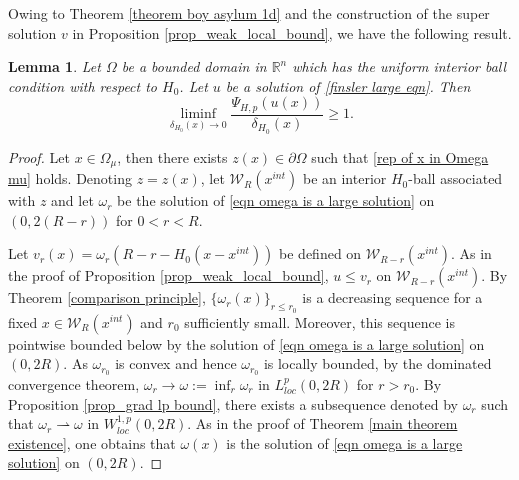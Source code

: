 \documentclass[11pt]{amsart}
\newtheorem{lemma}[theorem]{Lemma}
\newcommand{\rn}{\mathbb{R}^{n}}
\numberwithin{equation}{section}
\begin{document}
Owing to Theorem \ref{theorem boy asylum 1d} and the construction of the super solution $v$ in Proposition \ref{prop_weak_local_bound}, we have the following result.
   \begin{lemma}\label{lemma asym 1}
       Let $\Omega$ be a bounded domain in $\rn$ which has the uniform interior ball condition with respect to $H_{0}$. Let $u$ be a solution of \eqref{finsler large eqn}.  Then 
       \begin{equation*}
           \liminf_{\delta_{H_{0}}(x)\to 0}\frac{\Psi_{H,p}\left(u(x)\right)}{\delta_{H_{0}}(x)}\geq 1.
       \end{equation*}
   \end{lemma}
   \begin{proof}
   Let $x\in \Omega_{\mu}$, then there exists $z(x)\in \partial\Omega$ such that \eqref{rep of x in Omega mu} holds. Denoting $z=z(x)$, let $\mathcal{W}_{R}(x^{int})$ be an interior $H_{0}$-ball associated with $z$ and let $\omega_{r}$ be the solution of \eqref{eqn omega is a large solution} on $(0,2(R-r))$ for $0<r<R$.
   
   Let $v_{r}(x)=\omega_{r}\left(R-r-H_{0}(x-x^{int})\right)$ be defined on $\mathcal{W}_{R-r}(x^{int})$. As in the proof of Proposition \ref{prop_weak_local_bound}, $u\leq v_{r}$ on $\mathcal{W}_{R-r}(x^{int})$. By Theorem \ref{comparison principle}, $\{\omega_{r}(x)\}_{r\leq r_{0}}$ is a decreasing sequence for a fixed $x\in \mathcal{W}_{R}(x^{int})$ and $r_{0}$ sufficiently small. Moreover, this sequence is pointwise bounded below by the solution of \eqref{eqn omega is a large solution} on $(0,2R)$. As $\omega_{r_{0}}$ is convex and hence $\omega_{r_{0}}$ is locally bounded, by the dominated convergence theorem, $\omega_{r}\to \omega:=\inf_{r}\omega_{r}$ in $L^{p}_{loc}(0,2R)$ for $r>r_{0}$. By Proposition \ref{prop_grad lp bound}, there exists a subsequence denoted by $\omega_{r}$ such that $\omega_{r}\rightharpoonup \omega$ in $W^{1,p}_{loc}(0,2R)$. As in the proof of Theorem \ref{main theorem existence}, one obtains that $\omega(x)$ is the solution of \eqref{eqn omega is a large solution} on $(0,2R)$.  
    

\end{proof}
\end{document}
